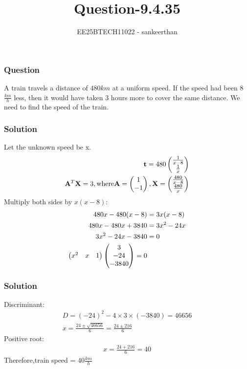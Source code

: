 \documentclass{beamer}
\title{Question-9.4.35}
\author{EE25BTECH11022 - sankeerthan}
\date{}
\begin{document}
\frame{\titlepage}

\begin{frame}
\frametitle{Question}
A train travels a distance of $480km$ at a uniform speed. If the speed had been 8$\frac{km}{h}$ less, then it would have taken 3 hours more to cover the same distance. We need to find the speed of the train.
\end{frame}

\begin{frame}
\frametitle{Solution}
Let the unknown speed be x.
\begin{align}
\mathbf{t} =480\begin{pmatrix}\frac{1}{x-8} \\\frac{1}{x}\end{pmatrix} \\
\mathbf{A}^T\mathbf{X} =3,\text{where}\mathbf{A} =\begin{pmatrix}1 \\ -1\end{pmatrix},
\mathbf{X} =\begin{pmatrix}\frac{480}{x-8} \\\frac{480}{x}\end{pmatrix}
\end{align}
Multiply both sides by $x(x-8)$:
\begin{align}
480x-480(x-8)&=3x(x-8) \\
480x-480x+3840 &=3x^2-24x \\
3x^2-24x-3840 &=0 \\
\begin{pmatrix}x^2 & x & 1\end{pmatrix}\begin{pmatrix}3 \\ -24\\ -3840\end{pmatrix} =0
\end{align}
\end{frame}
\begin{frame}
\frametitle{Solution}
Discriminant:
\begin{align}
D = (-24)^2 - 4 \times 3 \times (-3840) = 46656 \\
x = \frac{24 \pm \sqrt{46656}}{6} = \frac{24 \pm 216}{6}
\end{align}
Positive root:
\begin{align}
x = \frac{24 + 216}{6} = 40
\end{align}
Therefore,train speed = $40\frac{km}{h}$
\end{frame}
\end{document}
